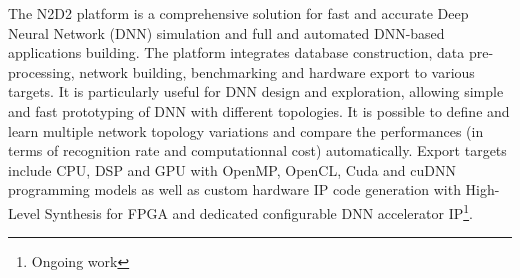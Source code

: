 \documentclass[a4paper,11pt,oneside]{article}
\newif\iffullmanual
\begin{document}
\vspace{7cm}

\noindent{}


\thispagestyle{empty}
\clearpage


\pagestyle{fancy}

\fancyhf{} %

\renewcommand{\footrulewidth}{0.4pt}%

\fancyfoot[R]{\thepage/\pageref{LastPage}}


\iffullmanual
\setcounter{tocdepth}{4}
\tableofcontents
\clearpage


\section{Presentation}
\fi

The N2D2 platform is a comprehensive solution for fast and accurate Deep Neural
Network (DNN) simulation and full and automated DNN-based applications
building. The platform integrates database construction, data pre-processing,
network building, benchmarking and hardware export to various targets. It is
particularly useful for DNN design and exploration, allowing simple and fast
prototyping of DNN with different topologies. It is possible to define and
learn multiple network topology variations and compare the performances (in
terms of recognition rate and computationnal cost) automatically.
Export targets include CPU, DSP and GPU with OpenMP, OpenCL, Cuda and cuDNN
programming models as well as custom hardware IP code generation with High-Level
Synthesis for FPGA and dedicated configurable DNN accelerator
IP\footnote{Ongoing work}.
\end{document}
